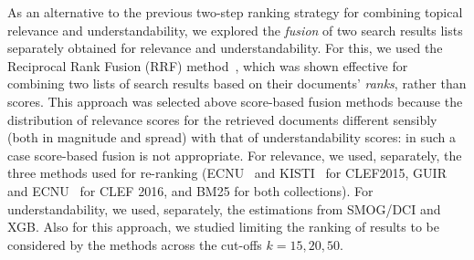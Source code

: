 \documentclass[10pt,a4paper]{article}
\begin{document}
As an alternative to the previous two-step ranking strategy for combining topical relevance and understandability, we explored the \textit{fusion} of two search results lists separately obtained for relevance and understandability. For this, we used the Reciprocal Rank Fusion (RRF) method~\cite{cormack09}, which was shown effective for combining two lists of search results based on their documents' \textit{ranks}, rather than scores. This approach was selected above score-based fusion methods
because the distribution of relevance scores for the retrieved documents different sensibly (both in magnitude and spread) with that of understandability scores: in such a case score-based fusion is not appropriate. 
For relevance, we used, separately, the three methods used for re-ranking (ECNU~\cite{song15} and KISTI~\cite{oh15} for CLEF2015, GUIR~\cite{soldaini16} and ECNU~\cite{song16} for CLEF 2016, and BM25 for both collections). For understandability, we used, separately, the estimations from SMOG/DCI and XGB. Also for this approach, we studied limiting the ranking of
results to be considered by the methods across the cut-offs $k=15, 20, 50$. 


\begin{table}[!t]
	\centering
	\caption{Learning to rank (LTR) settings. }
	\label{tab:ltr}
\end{table}
\end{document}

